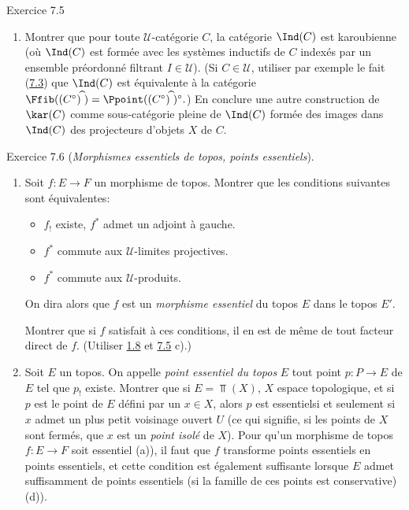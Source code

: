 \documentclass[10pt]{../fichiers-configuration-latex/smfart}
\begin{document}
\begin{enonce*}[remark]{Exercice 7.5}
\begin{enumerate}
\item Montrer que pour toute $𝒰$-catégorie $C$, la catégorie
$\Ind(C)$ est karoubienne (où $\Ind(C)$ est formée avec les systèmes
inductifs de $C$ indexés par un ensemble préordonné filtrant $I\in
𝒰$). (Si $C\in 𝒰$, utiliser par exemple le fait
(\hyperref[IV.subsec7.3]{7.3}) que $\Ind(C)$ est équivalente à la catégorie
$\Ffib((C^{\circ})^{\widehat{\phantom{,}}})=\Ppoint((C^{\circ})^{\widehat{\phantom{,}}})^{\circ}.$)
En conclure une autre construction de $\kar(C)$ comme sous-catégorie
pleine de $\Ind(C)$ formée des images dans $\Ind(C)$ des projecteurs
d'objets $X$ de $C$.
\end{enumerate}
\end{enonce*}

\begin{enonce*}[remark]{Exercice 7.6}
(\emph{Morphismes essentiels de topos, points essentiels}).
\begin{enumerate}
\renewcommand{\theenumi}{\alph{enumi}}
\renewcommand{\labelenumi}{\theenumi)}
\item Soit $f:E\rightarrow F$ un morphisme de topos. Montrer que les
conditions suivantes sont équivalentes:
\begin{itemize}
\item[i)] $f_{!}$ existe, \ie $f^{\ast}$ admet un adjoint à gauche.

\item[ii)] $f^{\ast}$ commute aux $𝒰$-limites projectives.

\item[${\rm ii')}$] $f^{\ast}$ commute aux $𝒰$-produits.
\end{itemize}
On dira alors que $f$ est un \emph{morphisme essentiel} du topos $E$
dans le topos $E'$.

Montrer que si $f$ satisfait à ces conditions, il en est de même de
tout facteur direct de $f$. (Utiliser \hyperref[IV.rem1.8]{1.8} et
\hyperref[IV.exer7.5]{7.5} c).)

\item Soit $E$ un topos. On appelle \emph{point essentiel du topos}
$E$ tout point $p:P\rightarrow E$ de $E$ tel que $p_{!}$ existe.
Montrer que si $E=\Top(X)$, $X$ espace topologique, et si $p$ est le
point de $E$ défini par un $x\in X$, alors $p$ est
essentiel\pageoriginale si et seulement si $x$ admet un plus petit
voisinage ouvert $U$ (ce qui signifie, si les points de $X$ sont
fermés, que $x$ est un \emph{point isolé} de $X$). Pour qu'un
morphisme de topos $f:E\rightarrow F$ soit essentiel (a)), il faut
que $f$ transforme points essentiels en points essentiels, et cette
condition est également suffisante lorsque $E$ admet suffisamment de
points essentiels (\ie si la famille de ces points est conservative)
(\cf d)).


\end{enumerate}
\end{enonce*}
\end{document}
